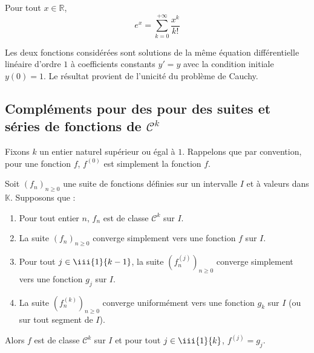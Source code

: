 \documentclass[french,11pt,twoside]{VcCours}
\begin{document}
\vspace*{9cm}

\begin{Corollaire}{} Pour tout $x \in \mathbb{R}$, 
$$ e^x = \sum_{k=0}^{+ \infty} \frac{x^k}{k!}$$
\end{Corollaire}

\begin{Demonstration}{} Les deux fonctions considérées sont solutions de la même équation différentielle linéaire d'ordre $1$ à coefficients constants $y'=y$ avec la condition initiale $y(0)=1$. Le résultat provient de l'unicité du problème de Cauchy.
\end{Demonstration}

\subsection{Compléments pour des pour des suites et séries de fonctions de \texorpdfstring{$\mathcal{C}^k$}{Cᵏ}}

Fixons $k$ un entier naturel supérieur ou égal à $1$. Rappelons que par convention, pour une fonction $f$, $f^{(0)}$ est simplement la fonction $f$.

\medskip

\begin{Theoreme}{} Soit $(f_n)_{n \geq 0}$ une suite de fonctions définies sur un intervalle $I$ et à valeurs dans $\mathbb{K}$. Supposons que :

\begin{enumerate}
\item Pour tout entier $n$, $f_n$ est de classe $\mathcal{C}^k$ sur $I$.
\item La suite $(f_n)_{n \geq 0}$ converge simplement vers une fonction $f$ sur $I$.
\item Pour tout $j \in \iii{1}{k-1}$, la suite $(f_n^{(j)})_{n \geq 0}$ converge simplement vers une fonction $g_j$ sur $I$.
\item La suite $(f_n^{(k)})_{n \geq 0}$ converge uniformément vers une fonction $g_k$ sur $I$ (ou sur tout segment de $I$).
\end{enumerate}
Alors $f$ est de classe $\mathcal{C}^k$ sur $I$ et pour tout $j \in \iii{1}{k}$, $f^{(j)} = g_j$.
\end{Theoreme}
\end{document}
